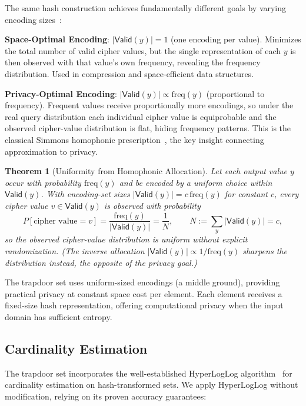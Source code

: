 \documentclass[10pt,conference]{IEEEtran}
\newtheorem{theorem}{Theorem}
\newcommand{\ValidEnc}[1]{\mathsf{Valid}(#1)}  %
\begin{document}
The same hash construction achieves fundamentally different goals by varying encoding sizes~\cite{bernoulli-types}:

\textbf{Space-Optimal Encoding}: $|\ValidEnc{y}| = 1$ (one encoding per value). Minimizes the total number of valid cipher values, but the single representation of each $y$ is then observed with that value's own frequency, revealing the frequency distribution. Used in compression and space-efficient data structures.

\textbf{Privacy-Optimal Encoding}: $|\ValidEnc{y}| \propto \text{freq}(y)$ (proportional to frequency). Frequent values receive proportionally more encodings, so under the real query distribution each individual cipher value is equiprobable and the observed cipher-value distribution is flat, hiding frequency patterns. This is the classical Simmons homophonic prescription~\cite{simmons1979symmetric}, the key insight connecting approximation to privacy.

\begin{theorem}[Uniformity from Homophonic Allocation]
\label{thm:homophonic-uniformity}
Let each output value $y$ occur with probability $\text{freq}(y)$ and be encoded by a uniform choice within $\ValidEnc{y}$. With encoding-set sizes $|\ValidEnc{y}| = c\,\text{freq}(y)$ for constant $c$, every cipher value $v \in \ValidEnc{y}$ is observed with probability
$$P[\text{cipher value} = v] = \frac{\text{freq}(y)}{|\ValidEnc{y}|} = \frac{1}{N}, \qquad N := \sum_y |\ValidEnc{y}| = c,$$
so the observed cipher-value distribution is uniform without explicit randomization. (The inverse allocation $|\ValidEnc{y}| \propto 1/\text{freq}(y)$ sharpens the distribution instead, the opposite of the privacy goal.)
\end{theorem}

The trapdoor set uses uniform-sized encodings (a middle ground), providing practical privacy at constant space cost per element. Each element receives a fixed-size hash representation, offering computational privacy when the input domain has sufficient entropy.

\subsection{Cardinality Estimation}

The trapdoor set incorporates the well-established HyperLogLog algorithm~\cite{flajolet2007hyperloglog} for cardinality estimation on hash-transformed sets. We apply HyperLogLog without modification, relying on its proven accuracy guarantees:
\end{document}
